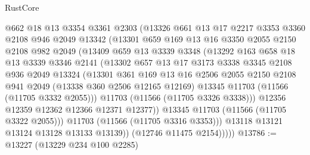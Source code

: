 \begin{lexlean}{RustCore}
\begin{coremodule}
                @662
                @18
                @13
                @3354
                @3361
                @2303
                (@13326
                  @661
                  @13
                  @17
                  @2217
                  @3353
                  @3360
                  @2108
                  @946
                  @2049
                  @13342
                  (@13301
                    @659
                    @169
                    @13
                    @16
                    @3350
                    @2055
                    @2150
                    @2108
                    @982
                    @2049
                    (@13409
                      @659
                      @13
                      @3339
                      @3348
                      (@13292
                        @163
                        @658
                        @18
                        @13
                        @3339
                        @3346
                        @2141
                        (@13302
                          @657
                          @13
                          @17
                          @3173
                          @3338
                          @3345
                          @2108
                          @936
                          @2049
                          @13324
                          (@13301
                            @361
                            @169
                            @13
                            @16
                            @2506
                            @2055
                            @2150
                            @2108
                            @941
                            @2049
                            (@13338 @360 @2506 @12165 @12169)
                            @13345
                            @11703
                            (@11566 (@11705 @3332 @2055)))
                          @11703
                          (@11566 (@11705 @3326 @3338)))
                        @12356
                        @12359
                        @12362
                        @12366
                        @12371
                        @12377))
                    @13345
                    @11703
                    (@11566 (@11705 @3322 @2055)))
                  @11703
                  (@11566 (@11705 @3316 @3353)))
                @13118
                @13121
                @13124
                @13128
                @13133
                @13139))
            (@12746 @11475 @2154)))))
@13786 := @13227 (@13229 @234 @100 @2285)

\end{coremodule}
\end{lexlean}
